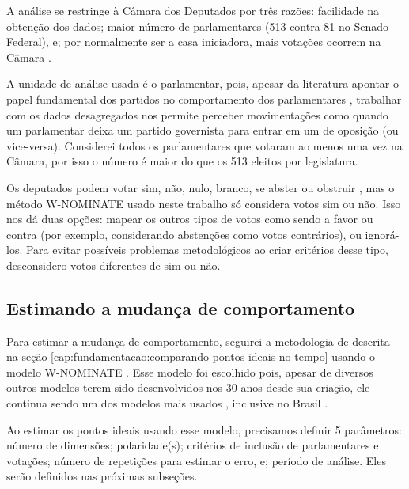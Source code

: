 \documentclass[a4paper,titlepage]{ppgi}\usepackage[]{graphicx}\usepackage[]{color}
\begin{document}

A análise se restringe à Câmara dos Deputados por três razões: facilidade na
obtenção dos dados; maior número de parlamentares (513 contra 81 no Senado
Federal), e; por normalmente ser a casa iniciadora, mais votações ocorrem na
Câmara \cite{Vicente2012}.

A unidade de análise usada é o parlamentar, pois, apesar da literatura apontar o
papel fundamental dos partidos no comportamento dos parlamentares
\cite{Figueiredo2001,Santos2003,Freitas2008}, trabalhar com os dados
desagregados nos permite perceber movimentações como quando um parlamentar
deixa um partido governista para entrar em um de oposição (ou vice-versa).
Considerei todos os parlamentares que votaram ao menos uma vez na Câmara, por
isso o número é maior do que os 513 eleitos por legislatura.


Os deputados podem votar sim, não, nulo, branco, se abster ou obstruir
\cite{Carneiro2013}, mas o método W-NOMINATE usado neste trabalho só considera
votos sim ou não. Isso nos dá duas opções: mapear os outros tipos de votos como
sendo a favor ou contra (por exemplo, considerando abstenções como votos
contrários), ou ignorá-los. Para evitar possíveis problemas metodológicos ao
criar critérios desse tipo, desconsidero votos diferentes de sim ou não.

\subsection{Estimando a mudança de comportamento}
\label{cap:desenvolvimento:estimando-mudanca-comportamento}

Para estimar a mudança de comportamento, seguirei a metodologia de
 descrita na seção
\ref{cap:fundamentacao:comparando-pontos-ideais-no-tempo} usando o modelo
W-NOMINATE \cite{Poole1985}. Esse modelo foi escolhido pois, apesar de
diversos outros modelos terem sido desenvolvidos nos 30 anos desde sua criação,
ele continua sendo um dos modelos mais usados \cite{Poole2011}, inclusive no
Brasil \cite{Leoni2002,Desposato2005b,Zucco2009,Freitas2012,Bernabel2015}.

Ao estimar os pontos ideais usando esse modelo, precisamos definir 5
parâmetros: número de dimensões; polaridade(s); critérios de inclusão de
parlamentares e votações; número de repetições para estimar o erro, e; período
de análise. Eles serão definidos nas próximas subseções.
\end{document}
